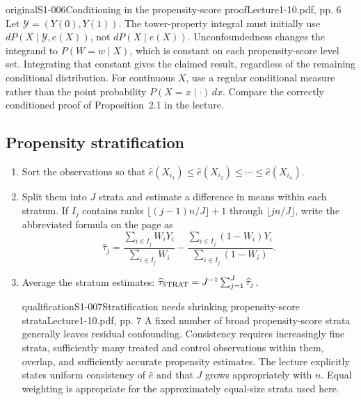 \begin{reviewnote}{original}{S1-006}{Conditioning in the propensity-score proof}{Lecture1-10.pdf, pp. 6}
Let $\mathcal Y=(Y(0),Y(1))$. The tower-property integral must initially use $dP(X\mid\mathcal Y,e(X))$, not $dP(X\mid e(X))$. Unconfoundedness changes the integrand to $P(W=w\mid X)$, which is constant on each propensity-score level set. Integrating that constant gives the claimed result, regardless of the remaining conditional distribution. For continuous $X$, use a regular conditional measure rather than the point probability $P(X=x\mid\cdot)\,dx$. Compare the correctly conditioned proof of Proposition~2.1 in the lecture.
\end{reviewnote}


\subsection{Propensity stratification}
\begin{enumerate}
\item Sort the observations so that $\widehat e(X_{i_1})\leq\widehat e(X_{i_2})\leq\cdots\leq\widehat e(X_{i_n})$.
\item Split them into $J$ strata and estimate a difference in means within each stratum. If $I_j$ contains ranks $\lfloor(j-1)n/J\rfloor+1$ through $\lfloor jn/J\rfloor$, write the abbreviated formula on the page as
\[
\widehat\tau_j=\frac{\sum_{i\in I_j}W_iY_i}{\sum_{i\in I_j}W_i}
-\frac{\sum_{i\in I_j}(1-W_i)Y_i}{\sum_{i\in I_j}(1-W_i)}.
\]
\item Average the stratum estimates: $\widehat\tau_{\rm STRAT}=J^{-1}\sum_{j=1}^J\widehat\tau_j$. 
\begin{reviewnote}{qualification}{S1-007}{Stratification needs shrinking propensity-score strata}{Lecture1-10.pdf, pp. 7}
A fixed number of broad propensity-score strata generally leaves residual confounding. Consistency requires increasingly fine strata, sufficiently many treated and control observations within them, overlap, and sufficiently accurate propensity estimates. The lecture explicitly states uniform consistency of $\widehat e$ and that $J$ grows appropriately with $n$. Equal weighting is appropriate for the approximately equal-size strata used here.
\end{reviewnote}

\end{enumerate}
